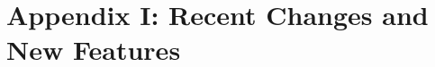 \documentclass[12pt,twoside]{article}
\newcommand{\mylink}[2]{%
\latexhtml{\hyperlink{#1}{#2}}{\hyperref{#2}{}{}{#1}}}
\newcommand{\mylinkext}[2]{%
\latexhtml{\htmlref{#2}{#1}}{\hyperref{#2}{}{}{#1}}}
\begin{document}
\begin{itemize}
%
%
\end{itemize}


\vfill\newpage
\section{Appendix I: Recent Changes and New Features}
\label{sec:newfeatures}
\end{document}
